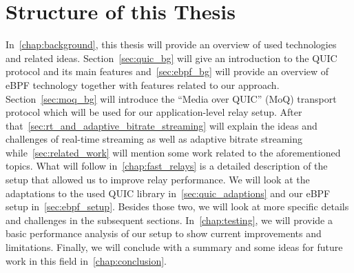 \section{Structure of this Thesis}\label{sec:structure_of_thesis}

In~\autoref{chap:background}, this thesis will provide an overview of used technologies
and related ideas.
Section~\ref{sec:quic_bg} will give an introduction to the QUIC protocol and its main features 
and~\autoref{sec:ebpf_bg} will provide an overview of eBPF technology together with features related to 
our approach.
Section~\ref{sec:moq_bg} will introduce the ``Media over QUIC'' (MoQ) transport protocol which will be used 
for our application-level relay setup.
After that~\autoref{sec:rt_and_adaptive_bitrate_streaming} will explain the ideas and challenges of 
real-time streaming as well as adaptive bitrate streaming while~\autoref{sec:related_work} will 
mention some work related to the aforementioned topics.
What will follow in~\autoref{chap:fast_relays} is a detailed description of the setup that 
allowed us to improve relay performance. 
We will look at the adaptations to the used QUIC library in~\autoref{sec:quic_adaptions} and 
our eBPF setup in~\autoref{sec:ebpf_setup}. Besides those two, we will look at more specific details and challenges in the subsequent sections.
In~\autoref{chap:testing}, we will provide a basic performance analysis of our setup to show current improvements and limitations.
Finally, we will conclude with a summary and some ideas for future work in this field in~\autoref{chap:conclusion}.